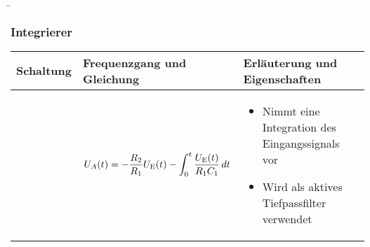 
\begin{frame}
    \b{
    \frametitle{Integrierer}
    \centering
    \begin{table}[ht]
    \label{tab:Integrierer}
    \begin{tabular}{|m{}|m{}|m{}|}
    \hline
    Schaltung & Frequenzgang und Gleichung & Erläuterung und Eigenschaften\\ %
    \hline
    \vspace{0.5cm}
    \centering
    
     & 
     \begin{center}
    
     \[
     U_A(t) = - \frac{R_2}{R_1} U_{\textnormal{E}}(t) - \int_0^t \frac{U_{\textnormal{E}}(t)}{R_1 C_1} \, dt
     \]
     \end{center} 
     &
    \begin{itemize}
        \item Nimmt eine Integration des Eingangssignals vor
        \item Wird als aktives Tiefpassfilter verwendet
    \end{itemize} \\
    \hline
    \end{tabular}
    \end{table}
    }
\end{frame}


